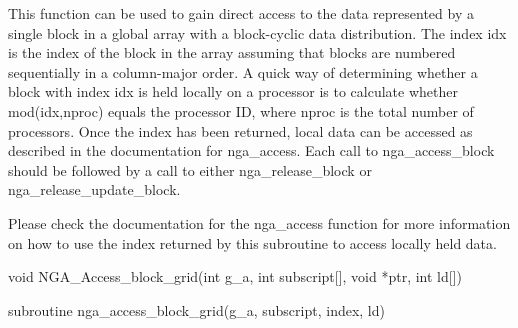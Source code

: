 \documentclass[12pt]{article}
\begin{document}
\begin{fdesc}
This function can be used to gain direct access to the data represented by a
single block in a global array with a block-cyclic data distribution.  The
index idx is the index of the block in the array assuming that blocks are
numbered sequentially in a column-major order. A quick way of determining
whether a block with index idx is held locally on a processor is to calculate
whether mod(idx,nproc) equals the processor ID, where nproc is the total number
of processors. Once the index has been returned, local data can be accessed as
described in the documentation for nga_access. Each call to nga_access_block
should be followed by a call to either nga_release_block or
nga_release_update_block.

Please check the documentation for the nga_access function for more information on
how to use the index returned by this subroutine to access locally held data.
\end{fdesc}



\begin{capi}
\begin{ccode}
void NGA_Access_block_grid(int g_a, int subscript[], void *ptr, int ld[])
\end{ccode}
\begin{funcargs}
\end{funcargs}
\end{capi}

\begin{fapi}
\begin{fcode}
subroutine nga_access_block_grid(g_a, subscript, index, ld)
\end{fcode}
\begin{funcargs}
\end{funcargs}
\end{fapi}
\end{document}
